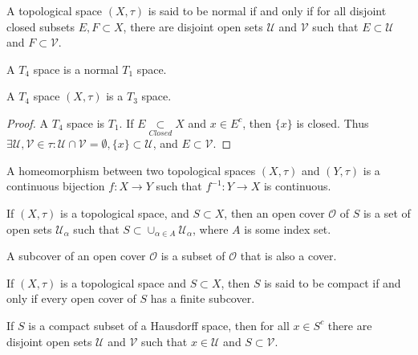 \documentclass[crop=false,class=book,oneside]{standalone}
\begin{document}
            \begin{definition}
            A topological space $(X,\tau)$ is said to be normal if and only if for all disjoint closed subsets $E,F\subset X$, there are disjoint open sets $\mathcal{U}$ and $\mathcal{V}$ such that $E\subset \mathcal{U}$ and $F\subset \mathcal{V}$.
            \end{definition}
            \begin{definition}
            A $T_4$ space is a normal $T_1$ space.
            \end{definition}
            \begin{theorem}
            A $T_4$ space $(X,\tau)$ is a $T_3$ space.
            \end{theorem}
            \begin{proof}
            A $T_4$ space is $T_1$. If $E\underset{Closed}\subset X$ and $x\in E^c$, then $\{x\}$ is closed. Thus $\exists \mathcal{U},\mathcal{V}\in\tau: \mathcal{U}\cap\mathcal{V}=\emptyset, \{x\}\subset \mathcal{U}$, and $E\subset \mathcal{V}$.
            \end{proof}
            \begin{definition}
            A homeomorphism between two topological spaces $(X,\tau)$ and $(Y,\tau)$ is a continuous bijection $f:X\rightarrow Y$ such that $f^{-1}:Y\rightarrow X$ is continuous.
            \end{definition}
            \begin{definition}
            If $(X,\tau)$ is a topological space, and $S\subset X$, then an open cover $\mathcal{O}$ of $S$ is a set of open sets $\mathcal{U}_{\alpha}$ such that $S\subset \cup_{\alpha\in A} \mathcal{U}_{\alpha}$, where $A$ is some index set.
            \end{definition}
            \begin{definition}
            A subcover of an open cover $\mathcal{O}$ is a subset of $\mathcal{O}$ that is also a cover.
            \end{definition}
            \begin{definition}
            If $(X,\tau)$ is a topological space and $S\subset X$, then $S$ is said to be compact if and only if every open cover of $S$ has a finite subcover.
            \end{definition}
            \begin{theorem}
            If $S$ is a compact subset of a Hausdorff space, then for all $x\in S^c$ there are disjoint open sets $\mathcal{U}$ and $\mathcal{V}$ such that $x\in \mathcal{U}$ and $S\subset \mathcal{V}$.
            \end{theorem}
\end{document}
